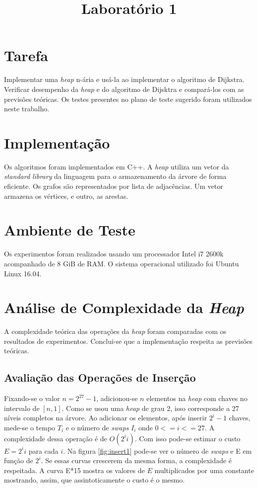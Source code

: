 \documentclass{iiufrgs}
\title{Laboratório 1}
\author{}{Thiago Bell}
\begin{document}
\maketitle

\setcounter{chapter}{1}

\section{Tarefa}
Implementar uma \textit{heap} n-ária e usá-la ao implementar o algoritmo de Dijkstra. 
Verificar desempenho da \textit{heap} e do algoritmo de Dijsktra e compará-los com as previs\~oes teóricas.
Os testes presentes no plano de teste sugerido foram utilizados neste trabalho.

\section{Implementaç\~ao}
Os algoritmos foram implementados em C++. A \textit{heap} utiliza um vetor da \textit{standard library} da linguagem para
o armazenamento da árvore de forma eficiente. Os grafos s\~ao representados
por lista de adjacências. Um vetor armazena os vértices, e outro, as arestas.

\section{Ambiente de Teste}
Os experimentos foram realizados usando um processador Intel i7 2600k acompanhado de 8 GiB de RAM. 
O sistema operacional utilizado foi Ubuntu Linux 16.04.

\section{Análise de Complexidade da \textit{Heap}}
A complexidade teórica das operaç\~oes da \textit{heap} foram comparadas com os resultados de experimentos.
Conclui-se que a implementaç\~ao respeita as previs\~oes teóricas.

\subsection{Avaliaç\~ao das Operaç\~oes de Inserç\~ao}
Fixando-se o valor $n = 2^{27}-1$, adicionou-se $n$ elementos na \textit{heap} com chaves no intervalo de $[n,1]$.  
Como se usou uma \textit{heap} de grau 2, isso corresponde a 27 níveis completos na árvore. 
Ao adicionar os elementos, após inserir $2^{i}-1$ chaves, mede-se o tempo $T_i$ e o número de \textit{swaps} 
$I_i$ onde $0<=i<=27$. A complexidade dessa operação é de $O(2^i  i)$.
Com isso pode-se estimar o custo $E = 2^i i$ para cada $i$. Na figura \ref{fig:insert1}
pode-se ver o número de \textit{swaps} e E em funç\~ao de $2^i$. Se essas curvas crescerem da mesma forma,
a complexidade é respeitada. A curva E*15 mostra os valores de $E$ multiplicados por
uma constante mostrando, assim, que assintoticamente o custo é o mesmo.
\end{document}
